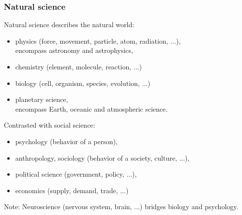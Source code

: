 \documentclass[aspectratio=169,xcolor=pdftex,dvipsnames]{beamer} %
\begin{document}
\begin{frame}
\frametitle{Natural science}

Natural science describes the natural world:
\begin{itemize}
\item
physics (force, movement, particle, atom, radiation, ...),\\
encompass astronomy and astrophysics,
\item
chemistry (element, molecule, reaction, ...)
\item
biology (cell, organism, species, evolution, ...)
\item
planetary science, \\
encompass Earth, oceanic and atmospheric science.
\end{itemize}

Contrasted with social science:
\begin{itemize}
\item
psychology (behavior of a person),
\item
anthropology, sociology (behavior of a society, culture, ...),
\item
political science (government, policy, ...),
\item
economics (supply, demand, trade, ...)
\end{itemize}

Note: Neuroscience (nervous system, brain, ...) bridges biology and psychology.

\end{frame}



\end{document}
